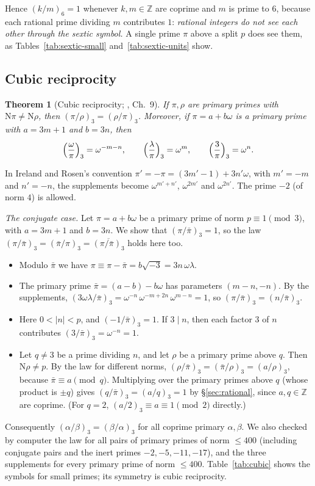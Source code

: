 \documentclass[11pt]{article}
\numberwithin{equation}{section}
\newcommand{\N}{\mathrm N}
\newcommand{\Z}{\mathbb Z}
\newtheorem{theorem}{Theorem}
\theoremstyle{definition}
\theoremstyle{remark}
\begin{document}
Hence $(k/m)_6=1$ whenever $k,m\in\Z$ are coprime and $m$ is prime to $6$, because each rational prime
dividing $m$ contributes $1$: \emph{rational integers do not see each other through the sextic symbol.}
A single prime $\pi$ above a split $p$ does see them, as Tables~\ref{tab:sextic-small}
and~\ref{tab:sextic-units} show.

\subsection{Cubic reciprocity}\label{sec:cubicrec}
\begin{theorem}[Cubic reciprocity; \cite{IR}, Ch.~9]\label{thm:cubic}
If $\pi,\rho$ are primary primes with $\N\pi\ne\N\rho$, then $(\pi/\rho)_3=(\rho/\pi)_3$.
Moreover, if $\pi=a+b\omega$ is a primary prime with $a=3m+1$ and $b=3n$, then
\begin{equation}\label{eq:supplements}
 \Bigl(\frac\omega\pi\Bigr)_3=\omega^{-m-n},\qquad
 \Bigl(\frac\lambda\pi\Bigr)_3=\omega^{m},\qquad
 \Bigl(\frac3\pi\Bigr)_3=\omega^{n}.
\end{equation}
\end{theorem}
In Ireland and Rosen's convention $\pi'=-\pi=(3m'-1)+3n'\omega$, with $m'=-m$ and $n'=-n$, the
supplements become $\omega^{m'+n'}$, $\omega^{2m'}$ and $\omega^{2n'}$. The prime $-2$ (of norm $4$) is allowed.

\emph{The conjugate case.} Let $\pi=a+b\omega$ be a primary prime of norm $p\equiv1\pmod3$, with
$a=3m+1$ and $b=3n$. We show that $(\pi/\bar\pi)_3=1$, so the law
$(\pi/\bar\pi)_3=(\bar\pi/\pi)_3=\overline{(\pi/\bar\pi)_3}$ holds here too.
\begin{itemize}
\item Modulo $\bar\pi$ we have $\pi\equiv\pi-\bar\pi=b\sqrt{-3}=3n\,\omega\lambda$.
\item The primary prime $\bar\pi=(a-b)-b\omega$ has parameters $(m-n,-n)$. By the supplements,
$(3\omega\lambda/\bar\pi)_3=\omega^{-n}\,\omega^{-m+2n}\,\omega^{m-n}=1$, so $(\pi/\bar\pi)_3=(n/\bar\pi)_3$.
\item Here $0<|n|<p$, and $(-1/\bar\pi)_3=1$. If $3\mid n$, then each factor $3$ of $n$ contributes
$(3/\bar\pi)_3=\omega^{-n}=1$.
\item Let $q\ne3$ be a prime dividing $n$, and let $\rho$ be a primary prime above $q$. Then $\N\rho\ne p$.
By the law for different norms, $(\rho/\bar\pi)_3=(\bar\pi/\rho)_3=(a/\rho)_3$, because
$\bar\pi\equiv a\pmod q$. Multiplying over the primary primes above $q$ (whose product is $\pm q$)
gives $(q/\bar\pi)_3=(a/q)_3=1$ by \S\ref{sec:rational}, since $a,q\in\Z$ are coprime. (For $q=2$,
$(a/2)_3\equiv a\equiv1\pmod 2$ directly.)
\end{itemize}
Consequently $(\alpha/\beta)_3=(\beta/\alpha)_3$ for all coprime primary $\alpha,\beta$. We also
checked by computer the law for all pairs of primary primes of norm $\le400$ (including conjugate
pairs and the inert primes $-2,-5,-11,-17$), and the three supplements for every primary prime of
norm $\le400$. Table~\ref{tab:cubic} shows the symbols for small primes; its symmetry is cubic
reciprocity.
\end{document}
